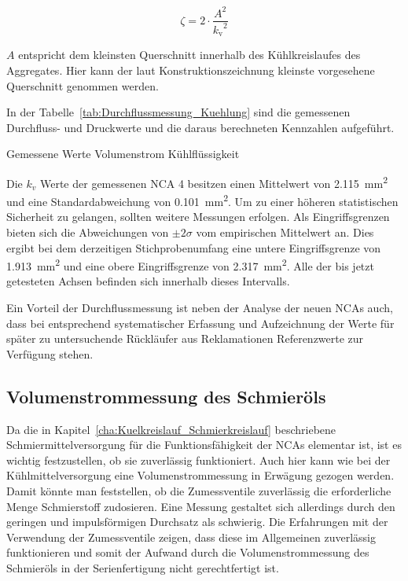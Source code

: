 \begin{equation}\label{eq:Druckverlustbeiwert}
\zeta = 2 \cdot \frac{ A^2}{ {k_\mathrm{v}}^2}
\end{equation}

$A$ entspricht dem kleinsten Querschnitt innerhalb des Kühlkreislaufes des Aggregates. Hier kann der laut Konstruktionszeichnung kleinste vorgesehene Querschnitt genommen werden.

In der Tabelle~\ref{tab:Durchflussmessung_Kuehlung} sind die gemessenen Durchfluss- und Druckwerte und die daraus berechneten Kennzahlen aufgeführt.


\begin{table}[h]
\centering

\caption{Gemessene Werte Volumenstrom Kühlflüssigkeit}
\label{tab:Durchflussmessung_Kuehlung}
\end{table}


Die $k_v$ Werte der gemessenen NCA 4 besitzen einen Mittelwert von \SI{2,115}{\milli\meter\squared} und eine Standardabweichung von \SI{0,101}{\milli\meter\squared}. Um zu einer höheren statistischen Sicherheit zu gelangen, sollten weitere Messungen erfolgen. Als Eingriffsgrenzen bieten sich die Abweichungen von $\pm 2\sigma$ vom empirischen Mittelwert an. Dies ergibt bei dem derzeitigen Stichprobenumfang eine untere Eingriffsgrenze von \SI{1,913}{\milli\meter\squared} und eine obere Eingriffsgrenze von \SI{2,317}{\milli\meter\squared}. Alle der bis jetzt getesteten Achsen befinden sich innerhalb dieses Intervalls.

Ein Vorteil der Durchflussmessung ist neben der Analyse der neuen NCAs auch, dass bei entsprechend systematischer Erfassung und Aufzeichnung der Werte für später zu untersuchende Rückläufer aus Reklamationen Referenzwerte zur Verfügung stehen.

\subsection{Volumenstrommessung des Schmieröls }

Da die in Kapitel~\ref{cha:Kuelkreislauf_Schmierkreislauf} beschriebene Schmiermittelversorgung für die Funktionsfähigkeit der NCAs elementar ist, ist es wichtig festzustellen, ob sie zuverlässig funktioniert. Auch hier kann wie bei der Kühlmittelversorgung eine Volumenstrommessung in Erwägung gezogen werden. Damit könnte man feststellen, ob die Zumessventile zuverlässig die erforderliche Menge Schmierstoff zudosieren. Eine Messung gestaltet sich allerdings durch den geringen und impulsförmigen Durchsatz als schwierig. Die Erfahrungen mit der Verwendung der Zumessventile zeigen, dass diese im Allgemeinen zuverlässig funktionieren und somit der Aufwand durch die Volumenstrommessung des Schmieröls in der Serienfertigung nicht gerechtfertigt ist. 

